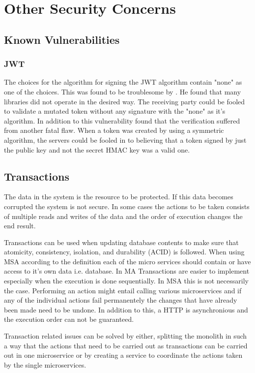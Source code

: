 \section{Other Security Concerns}
\subsection{Known Vulnerabilities}
\subsubsection{JWT}
\begin{sloppypar}
    The choices for the algorithm for signing the JWT algorithm contain "none"
    as one of the choices. This was found to be troublesome by . He found that
    many libraries did not operate in the desired way. The receiving party could
    be fooled to validate a mutated token without any signature with the "none"
    as it's algorithm. In addition to this vulnerability \citet{nonejwt} found
    that the verification suffered from another fatal flaw. When a token was
    created by using a symmetric algorithm, the servers could be fooled in to
    believing that a token signed by just the public key and not the secret HMAC
    key was a valid one.
\end{sloppypar}

\subsection{Transactions}
\begin{sloppypar}
    The data in the system is the resource to be protected. If this data becomes
    corrupted the system is not secure. In some cases the actions to be taken
    consists of multiple reads and writes of the data and the order of execution
    changes the end result.
\end{sloppypar}
\begin{sloppypar}
    Transactions can be used when updating database contents to make sure that
    atomicity, consistency, isolation, and durability (ACID) \citep{acid} is
    followed. When using MSA according to the definition each of the micro
    services should contain or have access to it's own data i.e. database. In MA
    Transactions are easier to implement especially when the execution is done
    sequentially. In MSA this is not necessarily the case. Performing an action
    might entail calling various microservices and if any of the individual
    actions fail permanentely the changes that have already been made need to be
    undone. In addition to this, a HTTP is asynchronious and the execution order
    can not be guaranteed. 
\end{sloppypar}
\begin{sloppypar}
    Transaction related issues can be solved by either, splitting the monolith
    in such a way that the actions that need to be carried out as transactions
    can be carried out in one microservice or by creating a service to
    coordinate the actions taken by the single microservices.
\end{sloppypar}

